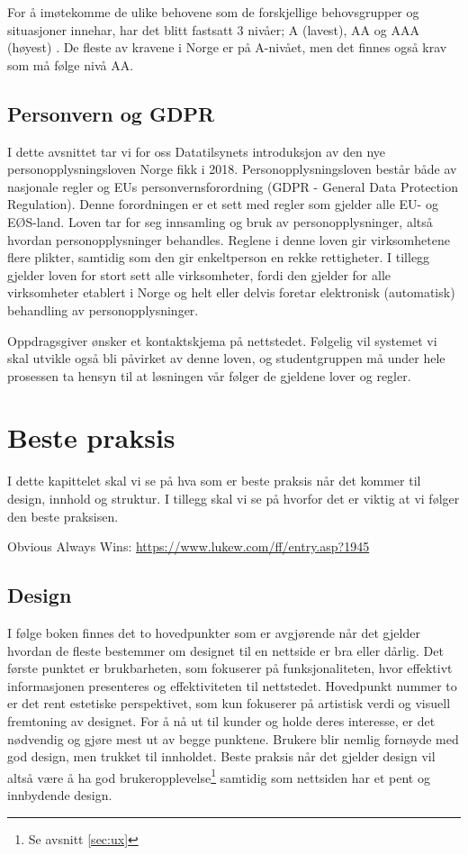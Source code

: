 For å imøtekomme de ulike behovene som de forskjellige behovsgrupper og situasjoner innehar, har det blitt fastsatt 3 nivåer; A (lavest), AA og AAA (høyest) \cite{w3c2008wca}. De fleste av kravene i Norge er på A-nivået, men det finnes også krav som må følge nivå AA.

\subsection{Personvern og GDPR}
I dette avsnittet tar vi for oss Datatilsynets \cite{data2018opm} introduksjon av den nye personopplysningsloven Norge fikk i 2018. Personopplysningsloven består både av nasjonale regler og EUs personvernsforordning (GDPR - General Data Protection Regulation). Denne forordningen er et sett med regler som gjelder alle EU- og EØS-land. Loven tar for seg innsamling og bruk av personopplysninger, altså hvordan personopplysninger behandles. Reglene i denne loven gir virksomhetene flere plikter, samtidig som den gir enkeltperson en rekke rettigheter. I tillegg gjelder loven for stort sett alle virksomheter, fordi den gjelder for alle virksomheter etablert i Norge og helt eller delvis foretar elektronisk (automatisk) behandling av personopplysninger. 

Oppdragsgiver ønsker et kontaktskjema på nettstedet. Følgelig vil systemet vi skal utvikle også bli påvirket av denne loven, og studentgruppen må under hele prosessen ta hensyn til at løsningen vår følger de gjeldene lover og regler.

\section{Beste praksis}

I dette kapittelet skal vi se på hva som er beste praksis når det kommer til design, innhold og struktur. I tillegg skal vi se på hvorfor det er viktig at vi følger den beste praksisen.

Obvious Always Wins:
\url{https://www.lukew.com/ff/entry.asp?1945}

\subsection{Design}
\label{sec:design}
I følge boken  \cite[s.~5]{beaird2014tpo} finnes det to hovedpunkter som er avgjørende når det gjelder hvordan de fleste bestemmer om designet til en nettside er bra eller dårlig. Det første punktet er brukbarheten, som fokuserer på funksjonaliteten, hvor effektivt informasjonen presenteres og effektiviteten til nettstedet. Hovedpunkt nummer to er det rent estetiske perspektivet, som kun fokuserer på artistisk verdi og visuell fremtoning av designet. For å nå ut til kunder og holde deres interesse, er det nødvendig og gjøre mest ut av begge punktene. Brukere blir nemlig fornøyde med god design, men trukket til innholdet.  Beste praksis når det gjelder design vil altså være å ha god brukeropplevelse\footnote{Se avsnitt \ref{sec:ux}} samtidig som nettsiden har et pent og innbydende design.

